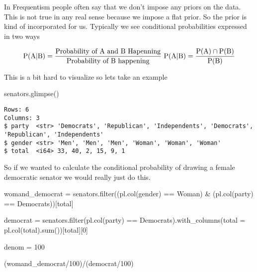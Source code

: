 \documentclass[
  letterpaper,
  DIV=11,
  numbers=noendperiod]{scrreprt}
\newenvironment{Shaded}{\begin{snugshade}}{\end{snugshade}}
\newcommand{\BuiltInTok}[1]{\textcolor[rgb]{0.00,0.23,0.31}{#1}}
\newcommand{\DecValTok}[1]{\textcolor[rgb]{0.68,0.00,0.00}{#1}}
\newcommand{\NormalTok}[1]{\textcolor[rgb]{0.00,0.23,0.31}{#1}}
\newcommand{\OperatorTok}[1]{\textcolor[rgb]{0.37,0.37,0.37}{#1}}
\newcommand{\StringTok}[1]{\textcolor[rgb]{0.13,0.47,0.30}{#1}}
\begin{document}
In Frequentism people often say that we don't impose any priors on the
data. This is not true in any real sense because we impose a flat prior.
So the prior is kind of incorporated for us. Typically we see
conditional probabilities expressed in two ways

\[
\text{P(A|B)} = \frac{\text{Probability of A and B Hapenning}}{\text{Probability of B happening}} \\\
\text{P(A|B)} = \frac{\text{P(A)} \cap \text{P(B)}}{\text{P(B)}} 
\]

This is a bit hard to visualize so lets take an example

\begin{Shaded}
\begin{Highlighting}[]
\NormalTok{senators.glimpse()}
\end{Highlighting}
\end{Shaded}

\begin{verbatim}
Rows: 6
Columns: 3
$ party  <str> 'Democrats', 'Republican', 'Independents', 'Democrats', 'Republican', 'Independents'
$ gender <str> 'Men', 'Men', 'Men', 'Woman', 'Woman', 'Woman'
$ total  <i64> 33, 40, 2, 15, 9, 1
\end{verbatim}

So if we wanted to calculate the conditional probability of drawing a
female democratic senator we would really just do this.

\begin{Shaded}
\begin{Highlighting}[]
\NormalTok{womand\_democrat }\OperatorTok{=}\NormalTok{ senators.}\BuiltInTok{filter}\NormalTok{((pl.col(}\StringTok{\textquotesingle{}gender\textquotesingle{}}\NormalTok{) }\OperatorTok{==} \StringTok{\textquotesingle{}Woman\textquotesingle{}}\NormalTok{) }\OperatorTok{\&}\NormalTok{ (pl.col(}\StringTok{\textquotesingle{}party\textquotesingle{}}\NormalTok{) }\OperatorTok{==} \StringTok{\textquotesingle{}Democrats\textquotesingle{}}\NormalTok{))[}\StringTok{\textquotesingle{}total\textquotesingle{}}\NormalTok{]}

\NormalTok{democrat }\OperatorTok{=}\NormalTok{ senators.}\BuiltInTok{filter}\NormalTok{(pl.col(}\StringTok{\textquotesingle{}party\textquotesingle{}}\NormalTok{) }\OperatorTok{==} \StringTok{\textquotesingle{}Democrats\textquotesingle{}}\NormalTok{).with\_columns(total }\OperatorTok{=}\NormalTok{ pl.col(}\StringTok{\textquotesingle{}total\textquotesingle{}}\NormalTok{).}\BuiltInTok{sum}\NormalTok{())[}\StringTok{\textquotesingle{}total\textquotesingle{}}\NormalTok{][}\DecValTok{0}\NormalTok{]}

\NormalTok{denom }\OperatorTok{=} \DecValTok{100}

\NormalTok{(womand\_democrat}\OperatorTok{/}\DecValTok{100}\NormalTok{)}\OperatorTok{/}\NormalTok{(democrat}\OperatorTok{/}\DecValTok{100}\NormalTok{)}
\end{Highlighting}
\end{Shaded}
\end{document}
